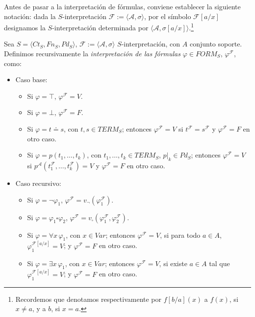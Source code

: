 Antes de pasar a la interpretación de fórmulas, conviene establecer la siguiente notación: dada la $S$-interpretación $\mathcal{F} := \langle \mathcal{A}, \sigma \rangle$, por el símbolo $\mathcal{F}[a/x]$ designamos la $S$-interpretación determinada por $\langle \mathcal{A}, \sigma[a/x]\rangle$.\footnote{Recordemos que denotamos respectivamente por $f[b/a](x)$ a $f(x)$, si $x \neq a$, y a $b$, si $x = a$.}

\begin{definition}
Sea $S = \langle Ct_{S}, Fn_{S}, Pd_{S}\rangle$, $\mathcal{F} := \langle \mathcal{A}, \sigma \rangle$ $S$-interpretación, con $A$ conjunto soporte.  Definimos recursivamente la \textit{interpretación de las fórmulas} $\varphi \in FORM_S$, $\varphi^{\mathcal{F}}$, como:
\begin{itemize}
    \item Caso base:
        \begin{itemize}
            \item Si $\varphi = \top$, $\varphi^{\mathcal{F}} = V$.
            \item Si $\varphi = \bot$, $\varphi^{\mathcal{F}} = F$.
            \item Si $\varphi = t \doteq s$, con $t, s \in TERM_S$; entonces $\varphi^{\mathcal{F}} = V$ si $t^{\mathcal{F}} = s^{\mathcal{F}}$ y $\varphi^{\mathcal{F}} = F$ en otro caso.
            \item Si $\varphi = p(t_1, \dots, t_k)$, con $t_1, \dots, t_k \in TERM_S$, $p|_k \in Pd_S$; entonces $\varphi^{\mathcal{F}} = V$ si $p^{\mathcal{A}}(t_{1}^{\mathcal{F}}, \dots, t_{k}^{\mathcal{F}}) = V$ y $\varphi^{\mathcal{F}} = F$ en otro caso. 
        \end{itemize}
    \item Caso recursivo:
        \begin{itemize}
            \item Si $\varphi = \neg \varphi_1$,  $\varphi^{\mathcal{F}} = v_{\neg}(\varphi_{1}^{\mathcal{F}})$.
            \item Si $\varphi = \varphi_1 \square \varphi_2$,  $\varphi^{\mathcal{F}} = v_{\square}(\varphi_{1}^{\mathcal{F}}, \varphi_{2}^{\mathcal{F}})$.
            \item Si $\varphi = \forall x \, \varphi_1$, con $x \in Var$; entonces $\varphi^{\mathcal{F}} = V$, si para todo $a \in A$, $\varphi_1^{\mathcal{F}[a/x]} = V$; y $\varphi^{\mathcal{F}} = F$ en otro caso.
            \item Si $\varphi = \exists x \, \varphi_1$, con $x \in Var$; entonces $\varphi^{\mathcal{F}} = V$, si existe $a \in A$ tal que $\varphi_1^{\mathcal{F}[a/x]} = V$; y $\varphi^{\mathcal{F}} = F$ en otro caso.
        \end{itemize}
\end{itemize}
\end{definition}

